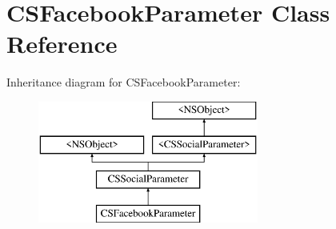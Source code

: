 \hypertarget{interface_c_s_facebook_parameter}{\section{C\-S\-Facebook\-Parameter Class Reference}
\label{interface_c_s_facebook_parameter}
}
Inheritance diagram for C\-S\-Facebook\-Parameter\-:\begin{figure}[H]
\begin{center}
\leavevmode
\includegraphics[height=4.000000cm]{interface_c_s_facebook_parameter}
\end{center}
\end{figure}
